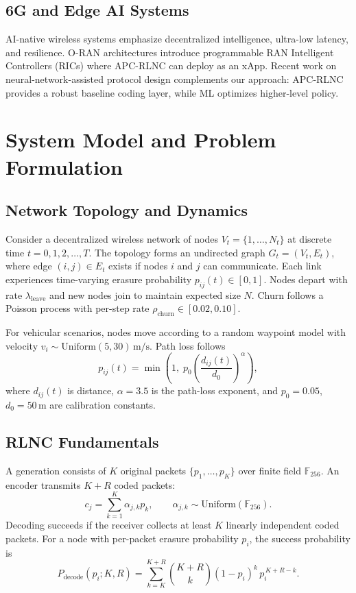 \documentclass[journal]{IEEEtran}
\begin{document}
\subsection{6G and Edge AI Systems}
AI-native wireless systems \cite{saad2020,letaief2019} emphasize decentralized intelligence, ultra-low latency, and resilience. O-RAN architectures \cite{oran2024} introduce programmable RAN Intelligent Controllers (RICs) where APC-RLNC can deploy as an xApp. Recent work on neural-network-assisted protocol design \cite{letaief2019} complements our approach: APC-RLNC provides a robust baseline coding layer, while ML optimizes higher-level policy.

\section{System Model and Problem Formulation}
\label{sec:model}

\subsection{Network Topology and Dynamics}
Consider a decentralized wireless network of nodes $V_t = \{1,\dots,N_t\}$ at discrete time $t = 0,1,2,\dots,T$. The topology forms an undirected graph $G_t = (V_t, E_t)$, where edge $(i,j) \in E_t$ exists if nodes $i$ and $j$ can communicate. Each link experiences time-varying erasure probability $p_{ij}(t) \in [0,1]$. Nodes depart with rate $\lambda_{\text{leave}}$ and new nodes join to maintain expected size $N$. Churn follows a Poisson process with per-step rate $\rho_{\text{churn}} \in [0.02, 0.10]$.

For vehicular scenarios, nodes move according to a random waypoint model with velocity $v_i \sim \text{Uniform}(5, 30)\,\text{m/s}$. Path loss follows
\begin{equation}
p_{ij}(t) = \min\!\left(1,\; p_0 \left(\frac{d_{ij}(t)}{d_0}\right)^{\alpha}\right),
\label{eq:pathloss}
\end{equation}
where $d_{ij}(t)$ is distance, $\alpha = 3.5$ is the path-loss exponent, and $p_0 = 0.05$, $d_0 = 50$\,m are calibration constants.

\subsection{RLNC Fundamentals}
A generation consists of $K$ original packets $\{p_1,\dots,p_K\}$ over finite field $\mathbb{F}_{256}$. An encoder transmits $K+R$ coded packets:
\begin{equation}
c_j = \sum_{k=1}^{K} \alpha_{j,k} p_k, \qquad \alpha_{j,k} \sim \text{Uniform}(\mathbb{F}_{256}).
\label{eq:rlnc-encode}
\end{equation}
Decoding succeeds if the receiver collects at least $K$ linearly independent coded packets. For a node with per-packet erasure probability $p_i$, the success probability is
\begin{equation}
P_{\text{decode}}(p_i; K, R) = \sum_{k=K}^{K+R} \binom{K+R}{k} (1-p_i)^k \, p_i^{\,K+R-k}.
\label{eq:decode-prob}
\end{equation}
\end{document}
